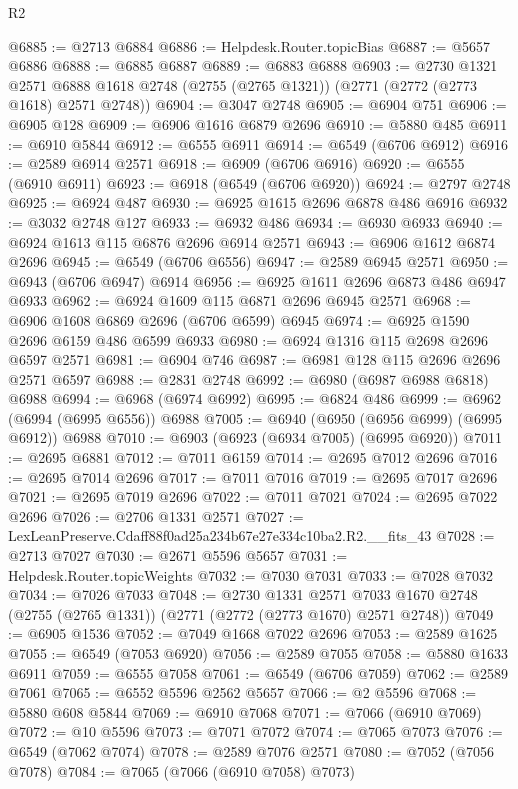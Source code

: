 \begin{lexlean}{R2}
\begin{coremodule}
@6885 := @2713 @6884
@6886 := Helpdesk.Router.topicBias
@6887 := @5657 @6886
@6888 := @6885 @6887
@6889 := @6883 @6888
@6903 := @2730
    @1321
    @2571
    @6888
    @1618
    @2748
    (@2755 (@2765 @1321))
    (@2771 (@2772 (@2773 @1618) @2571 @2748))
@6904 := @3047 @2748
@6905 := @6904 @751
@6906 := @6905 @128
@6909 := @6906 @1616 @6879 @2696
@6910 := @5880 @485
@6911 := @6910 @5844
@6912 := @6555 @6911
@6914 := @6549 (@6706 @6912)
@6916 := @2589 @6914 @2571
@6918 := @6909 (@6706 @6916)
@6920 := @6555 (@6910 @6911)
@6923 := @6918 (@6549 (@6706 @6920))
@6924 := @2797 @2748
@6925 := @6924 @487
@6930 := @6925 @1615 @2696 @6878 @486 @6916
@6932 := @3032 @2748 @127
@6933 := @6932 @486
@6934 := @6930 @6933
@6940 := @6924 @1613 @115 @6876 @2696 @6914 @2571
@6943 := @6906 @1612 @6874 @2696
@6945 := @6549 (@6706 @6556)
@6947 := @2589 @6945 @2571
@6950 := @6943 (@6706 @6947) @6914
@6956 := @6925 @1611 @2696 @6873 @486 @6947 @6933
@6962 := @6924 @1609 @115 @6871 @2696 @6945 @2571
@6968 := @6906 @1608 @6869 @2696 (@6706 @6599) @6945
@6974 := @6925 @1590 @2696 @6159 @486 @6599 @6933
@6980 := @6924 @1316 @115 @2698 @2696 @6597 @2571
@6981 := @6904 @746
@6987 := @6981 @128 @115 @2696 @2696 @2571 @6597
@6988 := @2831 @2748
@6992 := @6980 (@6987 @6988 @6818) @6988
@6994 := @6968 (@6974 @6992)
@6995 := @6824 @486
@6999 := @6962 (@6994 (@6995 @6556)) @6988
@7005 := @6940 (@6950 (@6956 @6999) (@6995 @6912)) @6988
@7010 := @6903 (@6923 (@6934 @7005) (@6995 @6920))
@7011 := @2695 @6881
@7012 := @7011 @6159
@7014 := @2695 @7012 @2696
@7016 := @2695 @7014 @2696
@7017 := @7011 @7016
@7019 := @2695 @7017 @2696
@7021 := @2695 @7019 @2696
@7022 := @7011 @7021
@7024 := @2695 @7022 @2696
@7026 := @2706 @1331 @2571
@7027 := LexLeanPreserve.Cdaff88f0ad25a234b67e27e334c10ba2.R2.__fits_43
@7028 := @2713 @7027
@7030 := @2671 @5596 @5657
@7031 := Helpdesk.Router.topicWeights
@7032 := @7030 @7031
@7033 := @7028 @7032
@7034 := @7026 @7033
@7048 := @2730
    @1331
    @2571
    @7033
    @1670
    @2748
    (@2755 (@2765 @1331))
    (@2771 (@2772 (@2773 @1670) @2571 @2748))
@7049 := @6905 @1536
@7052 := @7049 @1668 @7022 @2696
@7053 := @2589 @1625
@7055 := @6549 (@7053 @6920)
@7056 := @2589 @7055
@7058 := @5880 @1633 @6911
@7059 := @6555 @7058
@7061 := @6549 (@6706 @7059)
@7062 := @2589 @7061
@7065 := @6552 @5596 @2562 @5657
@7066 := @2 @5596
@7068 := @5880 @608 @5844
@7069 := @6910 @7068
@7071 := @7066 (@6910 @7069)
@7072 := @10 @5596
@7073 := @7071 @7072
@7074 := @7065 @7073
@7076 := @6549 (@7062 @7074)
@7078 := @2589 @7076 @2571
@7080 := @7052 (@7056 @7078)
@7084 := @7065 (@7066 (@6910 @7058) @7073)

\end{coremodule}
\end{lexlean}
